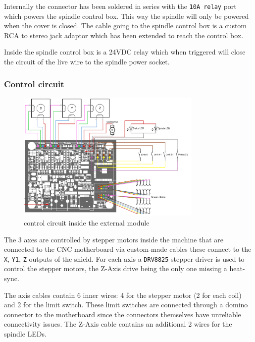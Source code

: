 \documentclass[11pt, openright]{book}
\begin{document}
      Internally the connector has been soldered in series with the \texttt{10A relay} port which powers the spindle control box. This way the spindle will only be powered when the cover is closed. The cable going to the spindle control box is a custom RCA to stereo jack adaptor which has been extended to reach the control box.

      Inside the spindle control box is a 24VDC relay which when triggered will close the circuit of the live wire to the spindle power socket. 

    \subsubsection{Control circuit}

        \begin{figure}[ht!]
            \centering
            \includegraphics[width=0.8\textwidth]{./includes/schema_command.png}
            \caption{control circuit inside the external module }
        \end{figure}

    The 3 axes are controlled by stepper motors inside the machine that are connected to the CNC motherboard via custom-made cables these connect to the \texttt{X}, \texttt{Y1}, \texttt{Z} outputs of the shield. For each axis a \texttt{DRV8825} stepper driver is used to control the stepper motors, the Z-Axis drive being the only one missing a heat-sync.
    
    The axis cables contain 6 inner wires: 4 for the stepper motor (2 for each coil) and 2 for the limit switch. These limit switches are connected through a domino connector to the motherboard since the connectors themselves have unreliable connectivity issues. The Z-Axis cable contains an additional 2 wires for the spindle LEDs. 
\end{document}
